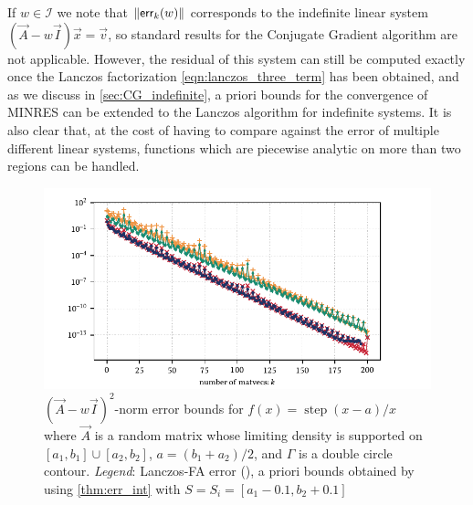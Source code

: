 If \( w \in \mathcal{I} \)  we note that \( \| \textup{\textsf{err}}_k(w) \| \) corresponds to the indefinite linear system \( (\vec{A} - w \vec{I}) \vec{x} = \vec{v} \), so standard results for the Conjugate Gradient algorithm are not applicable.
However, the residual of this system can still be computed exactly once the Lanczos factorization \cref{eqn:lanczos_three_term} has been obtained, and as we discuss in \cref{sec:CG_indefinite}, a priori bounds for the convergence of MINRES \cite{cullum_greenbaum_96} can be extended to the Lanczos algorithm for indefinite systems.
It is also clear that, at the cost of having to compare against the error of multiple different linear systems, functions which are piecewise analytic on more than two regions can be handled.

\begin{figure}[ht]
    \begin{center}
        \includegraphics{imgs/ch7_pcr.pdf} 
    \end{center}
    \caption[{\( (\vec{A}-w\vec{I})^2 \)-norm error bounds for \( f(x) = \operatorname{step}(x-a)/x \) where \( \vec{A} \) is a random matrix whose limiting density is supported on \( [a_1,b_1]\cup[a_2,b_2] \), $a = (b_1+a_2)/2$, and \( \Gamma \) is a double circle contour.}]{%
    \( (\vec{A}-w\vec{I})^2 \)-norm error bounds for \( f(x) = \operatorname{step}(x-a)/x \) where \( \vec{A} \) is a random matrix whose limiting density is supported on \( [a_1,b_1]\cup[a_2,b_2] \), $a = (b_1+a_2)/2$, and \( \Gamma \) is a double circle contour. 
    \hspace{.25em}\emph{Legend}:
    Lanczos-FA error 
    ({\protect{}}), 
    a priori bounds obtained by using \cref{thm:err_int} with \( S = S_i = [a_1-0.1,b_2+0.1]  \)
}
\end{figure}

